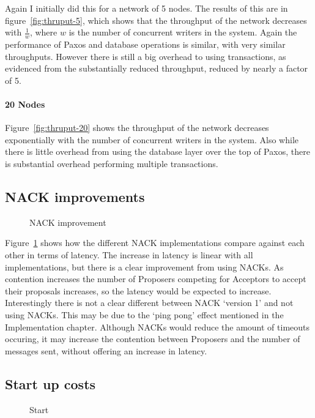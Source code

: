 \documentclass[12pt,twoside,notitlepage]{report}
\newcommand{\lwincludegraphics}[2][]{%
  \sbox{0}{\texttt{[image: \#2]}}%
  \ifdim\wd0>\linewidth
    \resizebox{\linewidth}{!}{\box0 }%
  \else
    \leavevmode\box0
  \fi}
\begin{document}
Again I initially did this for a network of 5 nodes. The results of this are in
figure~\ref{fig:thruput-5}, which shows that the throughput of the network decreases with
$\frac{1}{w}$, where $w$ is the number of concurrent writers in the system. Again the performance of
Paxos and database operations is similar, with very similar throughputs. However there is still a
big overhead to using transactions, as evidenced from the substantially reduced throughput,
reduced by nearly a factor of 5.

\paragraph{20 Nodes}

Figure~\ref{fig:thruput-20} shows the throughput of the network decreases exponentially with the
number of concurrent writers in the system. Also while there is little overhead from using the
database layer over the top of Paxos, there is substantial overhead performing multiple
transactions.

\subsection{NACK improvements}

\begin{figure}[Hhtb]
\centering
\lwincludegraphics[scale=2]{figs/lat_nack.eps}
\caption{\label{fig:nack}NACK improvement}
\end{figure}

Figure~\ref{fig:nack} shows how the different NACK implementations compare against each other in
terms of latency. The increase in latency is linear with all implementations, but there is a clear
improvement from using NACKs. As contention increases the number of Proposers competing for
Acceptors to accept their proposals increases, so the latency would be expected to increase.
Interestingly there is not a clear different between NACK `version 1' and not using NACKs. This
may be due to the `ping pong' effect mentioned in the Implementation chapter. Although NACKs would
reduce the amount of timeouts occuring, it may increase the contention between Proposers and the
number of messages sent, without offering an increase in latency.

\subsection{Start up costs}

\begin{figure}[Hhtb]
\centering
\lwincludegraphics[scale=2]{figs/start.eps}
\caption{\label{fig:start}Start}
\end{figure}
\end{document}
